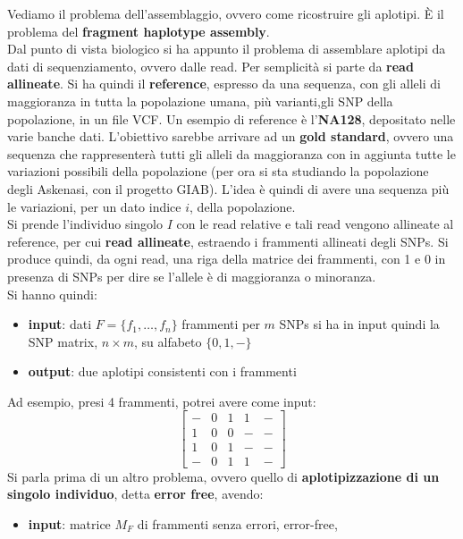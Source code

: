 \documentclass[a4paper,12pt, oneside]{book}
\begin{document}
\begin{esempio}
  Vediamo il problema dell'assemblaggio, ovvero come ricostruire gli aplotipi. È
  il problema del \textbf{fragment haplotype assembly}.\\
  Dal punto di vista biologico si ha appunto il problema di assemblare aplotipi
  da dati di sequenziamento, ovvero dalle read. Per semplicità si parte da
  \textbf{read allineate}. Si ha quindi il \textbf{reference}, espresso da una
  sequenza, con gli alleli di maggioranza in tutta la popolazione umana, più
  varianti,gli SNP della popolazione, in un file VCF. Un esempio di reference è
  l'\textbf{NA128}, depositato nelle varie banche dati. L'obiettivo sarebbe
  arrivare ad un \textbf{gold standard}, ovvero una sequenza che rappresenterà
  tutti gli alleli da maggioranza con in aggiunta tutte le variazioni possibili
  della popolazione (per ora si sta studiando la popolazione degli Askenasi, con
  il progetto GIAB). L'idea è quindi di avere una sequenza più le variazioni,
  per un dato indice $i$, della popolazione. \\
  Si prende l'individuo singolo $I$ con le read relative e tali read vengono
  allineate al reference, per cui \textbf{read allineate}, estraendo i frammenti
  allineati degli SNPs. Si produce quindi, da ogni read, una riga della matrice
  dei frammenti, con 1 e 0 in presenza di SNPs per dire se l'allele è di
  maggioranza o minoranza. \\
  Si hanno quindi:
  \begin{itemize}
    \item \textbf{input}: dati $F=\{f_1,\ldots,f_n\}$ frammenti per $m$ SNPs si
    ha in input quindi la SNP matrix, $n\times m$, su alfabeto $\{0,1,-\}$
    \item \textbf{output}: due aplotipi consistenti con i frammenti
  \end{itemize}
  Ad esempio, presi 4 frammenti, potrei avere come input:
  \[
    \left[
      \begin{matrix}
        - & 0 & 1 & 1 &-\\
        1 & 0 & 0 & - &-\\
        1 & 0 & 1 & - &-\\
        - & 0 & 1 & 1 &-
      \end{matrix}
    \right]
  \]
  Si parla prima di un altro problema, ovvero quello di \textbf{aplotipizzazione
    di un singolo individuo}, detta \textbf{error free}, avendo:
  \begin{itemize}
    \item \textbf{input}: matrice $M_F$ di frammenti senza errori, error-free,

\end{itemize}
\end{esempio}
\end{document}
